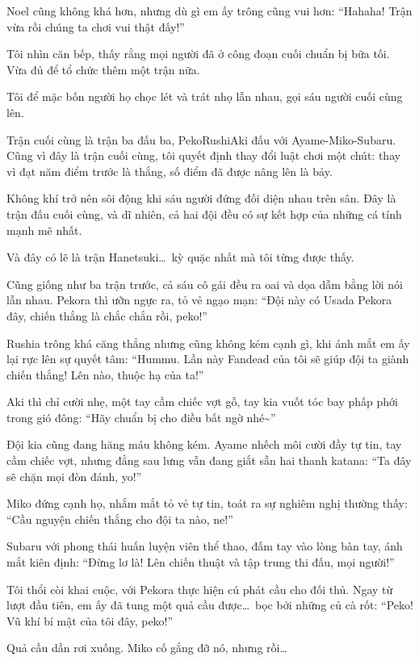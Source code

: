 \documentclass[../main.tex]{subfiles}
\begin{document}
Noel cũng không khá hơn, nhưng dù gì em ấy trông cũng vui hơn: ``Hahaha! Trận vừa rồi chúng ta chơi vui thật đấy!''

Tôi nhìn căn bếp, thấy rằng mọi người đã ở công đoạn cuối chuẩn bị bữa tối. Vừa đủ để tổ chức thêm một trận nữa.

Tôi để mặc bốn người họ chọc lét và trát nhọ lẫn nhau, gọi sáu người cuối cùng lên.

\ct

Trận cuối cùng là trận ba đấu ba, PekoRushiAki đấu với Ayame-Miko-Subaru. Cũng vì đây là trận cuối cùng, tôi quyết định thay đổi luật chơi một chút: thay vì đạt năm điểm trước là thắng, số điểm đã được nâng lên là bảy.

Không khí trở nên sôi động khi sáu người đứng đối diện nhau trên sân. Đây là trận đấu cuối cùng, và dĩ nhiên, cả hai đội đều có sự kết hợp của những cá tính mạnh mẽ nhất.

Và đây có lẽ là trận Hanetsuki\dots\ kỳ quặc nhất mà tôi từng được thấy.

Cũng giống như ba trận trước, cả sáu cô gái đều ra oai và dọa dẫm bằng lời nói lẫn nhau. Pekora thì ưỡn ngực ra, tỏ vẻ ngạo mạn: ``Đội này có Usada Pekora đây, chiến thắng là chắc chắn rồi, peko!''

Rushia trông khá căng thẳng nhưng cũng không kém cạnh gì, khi ánh mắt em ấy lại rực lên sự quyết tâm: ``Hummu. Lần này Fandead của tôi sẽ giúp đội ta giành chiến thắng! Lên nào, thuộc hạ của ta!''

Aki thì chỉ cười nhẹ, một tay cầm chiếc vợt gỗ, tay kia vuốt tóc bay phấp phới trong gió đông: ``Hãy chuẩn bị cho điều bất ngờ nhé\~{}''

Đội kia cũng đang hăng máu không kém. Ayame nhếch môi cười đầy tự tin, tay cầm chiếc vợt, nhưng đằng sau lưng vẫn đang giắt sẵn hai thanh katana: ``Ta đây sẽ chặn mọi đòn đánh, yo!''

Miko đứng cạnh họ, nhắm mắt tỏ vẻ tự tin, toát ra sự nghiêm nghị thường thấy: ``Cầu nguyện chiến thắng cho đội ta nào, ne!''

Subaru với phong thái huấn luyện viên thể thao, đấm tay vào lòng bàn tay, ánh mắt kiên định: ``Đừng lơ là! Lên chiến thuật và tập trung thi đấu, mọi người!''

Tôi thổi còi khai cuộc, với Pekora thực hiện cú phát cầu cho đối thủ. Ngay từ lượt đầu tiên, em ấy đã tung một quả cầu được\dots\ bọc bởi những củ cà rốt: ``Peko! Vũ khí bí mật của tôi đây, peko!''

Quả cầu dần rơi xuống. Miko cố gắng đỡ nó, nhưng rồi\dots
\end{document}
